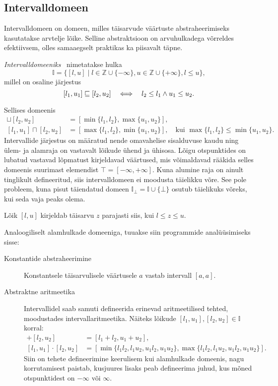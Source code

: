 \documentclass[../thesis.tex]{subfiles}
\begin{document}
\subsection{Intervalldomeen}
Intervalldomeen on domeen, milles täisarvude väärtuste abstraheerimiseks kasutatakse arvtelje lõike. Selline abstraktsioon on arvuhulkadega võrreldes efektiivsem, olles samaaegselt praktikas ka piisavalt täpne.

\begin{definition}
\emph{Intervalldomeeniks}~\cite[55]{seidl_foundations} nimetatakse hulka
\[
	\mathbb{I} = \{ [l, u] \mid l \in \mathbb{Z} \cup \{-\infty\}, u \in \mathbb{Z} \cup \{+\infty\}, l \leq u \},
\]
millel on osaline järjestus
\[
	[l_1, u_1] \sqsubseteq [l_2, u_2] \quad\Longleftrightarrow\quad l_2 \leq l_1 \land u_1 \leq u_2.
\]
\end{definition}

Sellises domeenis
\begin{align*}
	[l_1, u_1] \sqcup [l_2, u_2] &= [\min\{l_1, l_2\}, \max\{u_1, u_2\}], \\
	[l_1, u_1] \sqcap [l_2, u_2] &= [\max\{l_1, l_2\}, \min\{u_1, u_2\}],\quad \text{kui } \max\{l_1, l_2\} \leq \min\{u_1, u_2\}.
\end{align*}
Intervallide järjestus on määratud nende omavahelise sisalduvuse kaudu ning ülem- ja alamraja on vastavalt lõikude ühend ja ühisosa.
Lõigu otspunktides on lubatud vastavad lõpmatust kirjeldavad väärtused, mis võimaldavad rääkida selles domeenis suurimast elemendist $\top = [-\infty, +\infty]$.
Kuna alumine raja on ainult tinglikult defineeritud, siis intervalldomeen ei moodusta täielikku võre. See pole probleem, kuna pisut täiendatud domeen $\mathbb{I}_\bot = \mathbb{I} \cup \{\bot\}$ osutub täielikuks võreks, kui seda vaja peaks olema.

Lõik $[l, u]$ kirjeldab täisarvu $z$ parajasti siis, kui $l \leq z \leq u$.

Analoogiliselt alamhulkade domeeniga, tuuakse siin programmide analüüsimiseks sisse:
\begin{description}
	\item[Konstantide abstraheerimine] Konstantsele täisarvulisele väärtusele $a$ vastab intervall $[a, a]$.

	\item[Abstraktne aritmeetika] Intervallidel saab samuti defineerida erinevad aritmeetilised tehted, moodustades intervallaritmeetika. Näiteks lõikude $[l_1, u_1], [l_2, u_2] \in \mathbb{I}$ korral:
	\begin{align*}
		[l_1, u_1] + [l_2, u_2] &= [l_1 + l_2, u_1 + u_2], \\
		[l_1, u_1] \cdot [l_2, u_2] &= [\min\{l_1l_2, l_1u_2, u_1l_2, u_1u_2\}, \max\{l_1l_2, l_1u_2, u_1l_2, u_1u_2\}].
	\end{align*}
	Siin on tehete defineerimine keerulisem kui alamhulkade domeenis, nagu korrutamisest paistab, kusjuures lisaks peab defineerima juhud, kus mõned otspunktidest on $-\infty$ või $\infty$.
\end{description}
\end{document}
